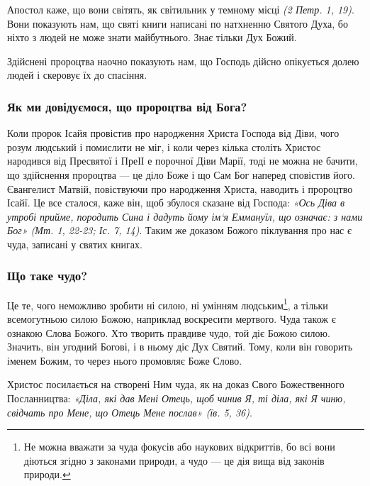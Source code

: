 \documentclass[main.tex]{subfiles}
\begin{document}
Апостол каже, що вони світять, як світильник у темному місці \emph{(2 Петр. 1, 19)}. Вони показують нам, що святі книги написані по натхненню Святого Духа, бо ніхто з людей не може знати майбутнього. Знає тільки Дух Божий.

Здійснені пророцтва наочно показують нам, що Господь дійсно опікується долею людей і скеровує їх до спасіння.

\subsubsection{Як ми довідуємося, що пророцтва від Бога?}

Коли пророк Ісайя провістив про народження Христа Господа від Діви, чого розум людський і помислити не міг, і коли через кілька століть Христос народився від Пресвятої і ПреІІ е порочної Діви Марії, тоді не можна не бачити, що здійснення пророцтва — це діло Боже і що Сам Бог наперед сповістив його. Євангелист Матвій, повіствуючи про народження Христа, наводить і пророцтво Ісайї. Це все сталося, каже він, щоб збулося сказане від Господа: \emph{«Ось Діва в утробі прийме, породить Сина і дадуть йому ім`я Еммануїл, що означає: з нами Бог» (Мт. 1, 22-23; Іс. 7, 14)}.
Таким же доказом Божого піклування про нас є чуда, записані у святих книгах.

\subsubsection{Що таке чудо?}

Це те, чого неможливо зробити ні силою, ні умінням людським\footnote{Не можна вважати за чуда фокусів або наукових відкриттів, бо всі вони діються згідно з законами природи, а чудо — це дія вища від законів природи.}, а тільки всемогутньою силою Божою, наприклад воскресити мертвого.
Чуда також є ознакою Слова Божого. Хто творить правдиве чудо, той діє Божою силою. Значить, він угодний Богові, і в ньому діє Дух Святий. Тому, коли він говорить іменем Божим, то через нього промовляє Боже Слово.

Христос посилається на створені Ним чуда, як на доказ Свого Божественного Посланництва: \emph{{\color{red} «Діла, які дав Мені Отець, щоб чинив Я, ті діла, які Я чиню, свідчать про Мене, що Отець Мене послав»} (їв. 5, 36)}.
\end{document}
